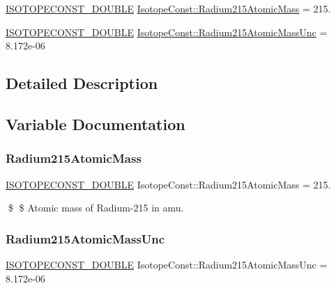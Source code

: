 \begin{DoxyCompactItemize}
\item 
\mbox{\hyperlink{group___isotope_const-_macros_ga8f45a7272ce02c0b4c65c44636ed719a}{I\+S\+O\+T\+O\+P\+E\+C\+O\+N\+S\+T\+\_\+\+D\+O\+U\+B\+LE}} \mbox{\hyperlink{group___isotope_const-_radium-_ra215_gadf288539e38adcce44e69ccafcbaf253}{Isotope\+Const\+::\+Radium215\+Atomic\+Mass}} = 215.
\item 
\mbox{\hyperlink{group___isotope_const-_macros_ga8f45a7272ce02c0b4c65c44636ed719a}{I\+S\+O\+T\+O\+P\+E\+C\+O\+N\+S\+T\+\_\+\+D\+O\+U\+B\+LE}} \mbox{\hyperlink{group___isotope_const-_radium-_ra215_gaa1d97cd64831b31b865d69cd282e6fca}{Isotope\+Const\+::\+Radium215\+Atomic\+Mass\+Unc}} = 8.\+172e-\/06
\end{DoxyCompactItemize}


\subsection{Detailed Description}


\subsection{Variable Documentation}
\mbox{\label{group___isotope_const-_radium-_ra215_gadf288539e38adcce44e69ccafcbaf253}} 
\subsubsection{\texorpdfstring{Radium215\+Atomic\+Mass}{Radium215AtomicMass}}
{\footnotesize\ttfamily \mbox{\hyperlink{group___isotope_const-_macros_ga8f45a7272ce02c0b4c65c44636ed719a}{I\+S\+O\+T\+O\+P\+E\+C\+O\+N\+S\+T\+\_\+\+D\+O\+U\+B\+LE}} Isotope\+Const\+::\+Radium215\+Atomic\+Mass = 215.}

\$ \$ Atomic mass of Radium-\/215 in amu. \mbox{\label{group___isotope_const-_radium-_ra215_gaa1d97cd64831b31b865d69cd282e6fca}} 
\subsubsection{\texorpdfstring{Radium215\+Atomic\+Mass\+Unc}{Radium215AtomicMassUnc}}
{\footnotesize\ttfamily \mbox{\hyperlink{group___isotope_const-_macros_ga8f45a7272ce02c0b4c65c44636ed719a}{I\+S\+O\+T\+O\+P\+E\+C\+O\+N\+S\+T\+\_\+\+D\+O\+U\+B\+LE}} Isotope\+Const\+::\+Radium215\+Atomic\+Mass\+Unc = 8.\+172e-\/06}

